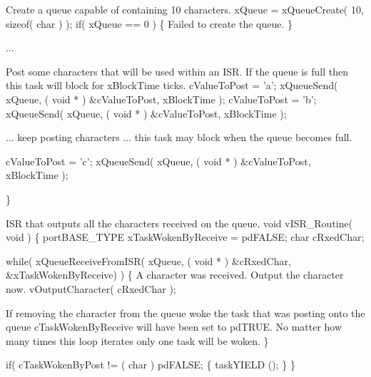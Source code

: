 \begin{DoxyPre}Create a queue capable of containing 10 characters.
    xQueue = xQueueCreate( 10, sizeof( char ) );
    if( xQueue == 0 )
    \{
Failed to create the queue.
    \}\end{DoxyPre}



\begin{DoxyPre}...\end{DoxyPre}



\begin{DoxyPre}Post some characters that will be used within an ISR.  If the queue
is full then this task will block for xBlockTime ticks.
    cValueToPost = 'a';
    xQueueSend( xQueue, ( void * ) \&cValueToPost, xBlockTime );
    cValueToPost = 'b';
    xQueueSend( xQueue, ( void * ) \&cValueToPost, xBlockTime );\end{DoxyPre}



\begin{DoxyPre}... keep posting characters ... this task may block when the queue
becomes full.
\begin{DoxyVerb}cValueToPost = 'c';
xQueueSend( xQueue, ( void * ) &cValueToPost, xBlockTime );
\end{DoxyVerb}

 \}\end{DoxyPre}



\begin{DoxyPre}ISR that outputs all the characters received on the queue.
 void vISR\_Routine( void )
 \{
 portBASE\_TYPE xTaskWokenByReceive = pdFALSE;
 char cRxedChar;\end{DoxyPre}



\begin{DoxyPre}    while( xQueueReceiveFromISR( xQueue, ( void * ) \&cRxedChar, \&xTaskWokenByReceive) )
    \{
A character was received.  Output the character now.
        vOutputCharacter( cRxedChar );\end{DoxyPre}



\begin{DoxyPre}If removing the character from the queue woke the task that was
posting onto the queue cTaskWokenByReceive will have been set to
pdTRUE.  No matter how many times this loop iterates only one
task will be woken.
    \}\end{DoxyPre}



\begin{DoxyPre}    if( cTaskWokenByPost != ( char ) pdFALSE;
    \{
        taskYIELD ();
    \}
 \}
 \end{DoxyPre}
 